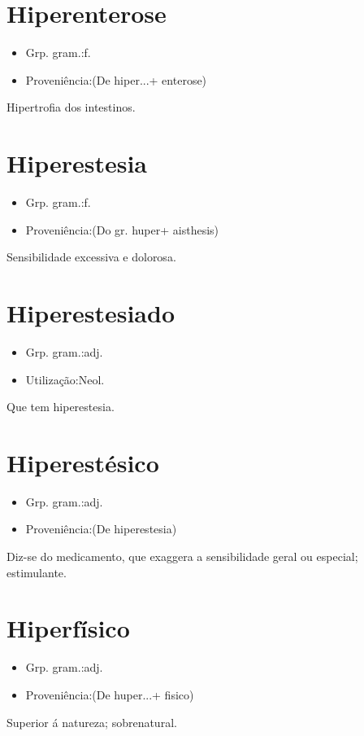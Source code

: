 \documentclass{article}
\begin{document}
\section{Hiperenterose}
\begin{itemize}
\item {Grp. gram.:f.}
\end{itemize}
\begin{itemize}
\item {Proveniência:(De \textunderscore hiper...\textunderscore  + \textunderscore enterose\textunderscore )}
\end{itemize}
Hipertrofia dos intestinos.
\section{Hiperestesia}
\begin{itemize}
\item {Grp. gram.:f.}
\end{itemize}
\begin{itemize}
\item {Proveniência:(Do gr. \textunderscore huper\textunderscore  + \textunderscore aisthesis\textunderscore )}
\end{itemize}
Sensibilidade excessiva e dolorosa.
\section{Hiperestesiado}
\begin{itemize}
\item {Grp. gram.:adj.}
\end{itemize}
\begin{itemize}
\item {Utilização:Neol.}
\end{itemize}
Que tem hiperestesia.
\section{Hiperestésico}
\begin{itemize}
\item {Grp. gram.:adj.}
\end{itemize}
\begin{itemize}
\item {Proveniência:(De \textunderscore hiperestesia\textunderscore )}
\end{itemize}
Diz-se do medicamento, que exaggera a sensibilidade geral ou especial; estimulante.
\section{Hiperfísico}
\begin{itemize}
\item {Grp. gram.:adj.}
\end{itemize}
\begin{itemize}
\item {Proveniência:(De \textunderscore huper...\textunderscore  + \textunderscore fisico\textunderscore )}
\end{itemize}
Superior á natureza; sobrenatural.
\end{document}
